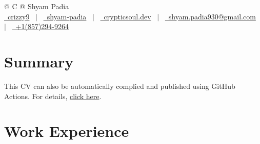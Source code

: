 \documentclass[a4paper,11pt]{article}
\begin{document}
\pagestyle{empty}



\begin{tabularx}{\linewidth}{@{} C @{}}
	\Huge{Shyam Padia}                                                          \\[7.5pt]
	\href{https://github.com/crizzy9}{\raisebox{-0.05\height}\faGithub\ crizzy9} \ $|$ \
	\href{https://linkedin.com/in/shyam-padia}{\raisebox{-0.05\height}\faLinkedin\ shyam-padia} \ $|$ \
	\href{https://crypticsoul.dev}{\raisebox{-0.05\height}\faGlobe \ crypticsoul.dev} \ $|$ \
	\href{mailto:shyam.padia930@gmail.com}{\raisebox{-0.05\height}\faEnvelope \ shyam.padia930@gmail.com} \ $|$ \
	\href{tel:+18572949264}{\raisebox{-0.05\height}\faMobile \ +1(857)294-9264} \\
\end{tabularx}


\section{Summary}
This CV can also be automatically complied and published using GitHub Actions. For details, \href{https://github.com/jitinnair1/autoCV}{click here}.

\section{Work Experience}
\end{document}
